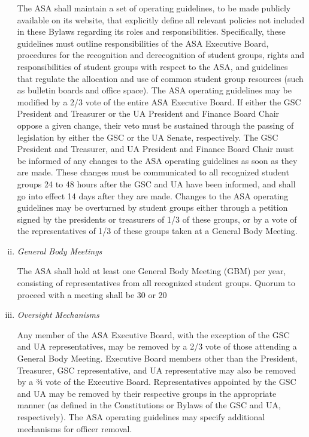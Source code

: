 \documentclass[12pt]{article}
\begin{document}
\begin{enumerate}[i.]
The ASA shall maintain a set of operating guidelines, to be made publicly available on its website, that explicitly define all relevant policies not included in these Bylaws regarding its roles and responsibilities. Specifically, these guidelines must outline responsibilities of the ASA Executive Board, procedures for the recognition and derecognition of student groups, rights and responsibilities of student groups with respect to the ASA, and guidelines that regulate the allocation and use of common student group resources (such as bulletin boards and office space). The ASA operating guidelines may be modified by a 2/3 vote of the entire ASA Executive Board. If either the GSC President and Treasurer or the UA President and Finance Board Chair oppose a given change, their veto must be sustained through the passing of legislation by either the GSC or the UA Senate, respectively. The GSC President and Treasurer, and UA President and Finance Board Chair must be informed of any changes to the ASA operating guidelines as soon as they are made. These changes must be communicated to all recognized student groups 24 to 48 hours after the GSC and UA have been informed, and shall go into effect 14 days after they are made. Changes to the ASA operating guidelines may be overturned by student groups either through a petition signed by the presidents or treasurers of 1/3 of these groups, or by a vote of the representatives of 1/3 of these groups taken at a General Body Meeting.

\item \textit{General Body Meetings}

The ASA shall hold at least one General Body Meeting (GBM) per year, consisting of representatives from all recognized student groups. Quorum to proceed with a meeting shall be 30 or 20%

\item \textit{Oversight Mechanisms}

Any member of the ASA Executive Board, with the exception of the GSC and UA representatives, may be removed by a 2/3 vote of those attending a General Body Meeting. Executive Board members other than the President, Treasurer, GSC representative, and UA representative may also be removed by a ¾ vote of the Executive Board. Representatives appointed by the GSC and UA may be removed by their respective groups in the appropriate manner (as defined in the Constitutions or Bylaws of the GSC and UA, respectively). The ASA operating guidelines may specify additional mechanisms for officer removal.


\end{enumerate}
\end{document}
